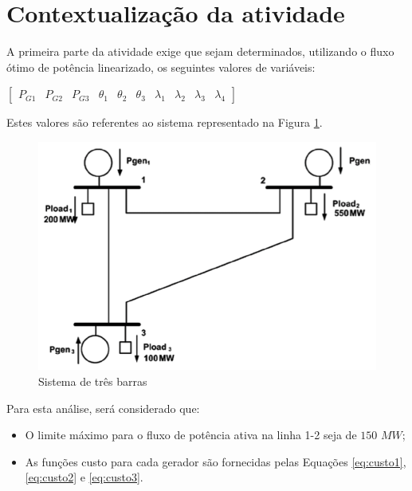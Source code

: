 \section{Contextualização da atividade}

A primeira parte da atividade exige que sejam determinados, utilizando o fluxo ótimo de potência linearizado, os seguintes valores de variáveis:
		
		\begin{normalsize}
		\centering

		$\begin{bmatrix}
			P_{G1} & P_{G2} & P_{G3} & \theta{_1} & \theta{_2} & \theta{_3} &
			\lambda{_1} & \lambda{_2} & \lambda{_3} & \lambda{_4}
		\end{bmatrix}$
		
		\end{normalsize}
		
		Estes valores são referentes ao sistema representado na Figura \ref{fig:sist}.
		
		\begin{figure}[!h]
		\centering
		\includegraphics[scale=.3]{sist1}
		\caption{Sistema de três barras}
		\label{fig:sist}
			
		\end{figure}
		
		Para esta análise, será considerado que:
		
		\begin{itemize}
			\item O limite máximo para o fluxo de potência ativa na linha 1-2 seja de $150$ $MW$;
			\item As funções custo para cada gerador são fornecidas pelas Equações \ref{eq:custo1}, \ref{eq:custo2} e \ref{eq:custo3}.
		\end{itemize}
		
